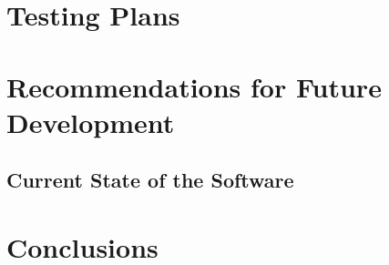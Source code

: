 \documentclass{article}
\begin{document}
\section{Testing Plans}

\section{Recommendations for Future Development}

\subsection{Current State of the Software}

\section{Conclusions}

\newpage
\printbibliography
\end{document}
